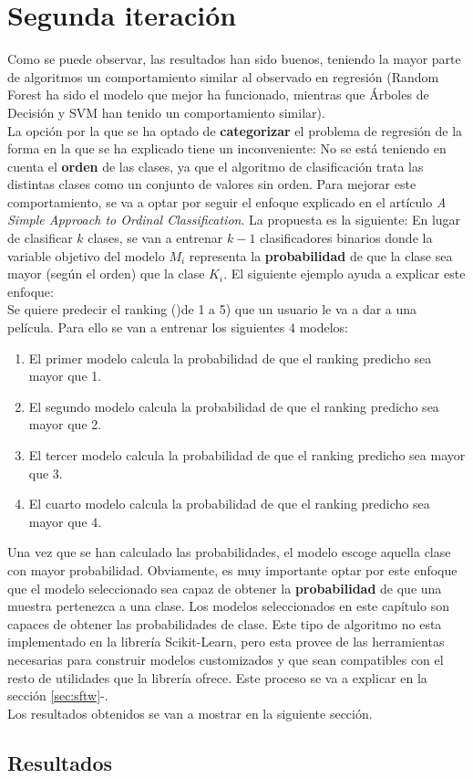 \section{Segunda iteración}
Como se puede observar, las resultados han sido buenos, teniendo la mayor parte de algoritmos un comportamiento similar al observado en regresión (Random Forest ha sido el modelo que mejor ha funcionado, mientras que Árboles de Decisión y SVM han tenido un comportamiento similar).\\
La opción por la que se ha optado de \textbf{categorizar} el problema de regresión de la forma en la que se ha explicado tiene un inconveniente: No se está teniendo en cuenta el \textbf{orden} de las clases, ya que el algoritmo de clasificación trata las distintas clases como un conjunto de valores sin orden.
Para mejorar este comportamiento, se va a optar por seguir el enfoque explicado en el artículo \textit{A Simple Approach to Ordinal Classification}. La propuesta es la siguiente:
En lugar de clasificar $k$ clases, se van a entrenar $k-1$ clasificadores binarios donde la variable objetivo del modelo $M_i$ representa la \textbf{probabilidad} de que la clase sea mayor (según el orden) que la clase $K_i$. El siguiente ejemplo ayuda a explicar este enfoque:\\
\linebreak
Se quiere predecir el ranking ()de 1 a 5) que un usuario le va a dar a una película. Para ello se van a entrenar los siguientes $4$ modelos:
\begin{enumerate}
    \item El primer modelo calcula la probabilidad de que el ranking predicho sea mayor que 1.
    \item El segundo modelo calcula la probabilidad de que el ranking predicho sea mayor que 2.
    \item El tercer modelo calcula la probabilidad de que el ranking predicho sea mayor que 3.
    \item El cuarto modelo calcula la probabilidad de que el ranking predicho sea mayor que 4.
\end{enumerate}
Una vez que se han calculado las probabilidades, el modelo escoge aquella clase con mayor probabilidad. Obviamente, es muy importante optar por este enfoque que el modelo seleccionado sea capaz de obtener la \textbf{probabilidad} de que una muestra pertenezca a una clase. Los modelos seleccionados en este capítulo son capaces de obtener las probabilidades de clase.
\linebreak
Este tipo de algoritmo no esta implementado en la librería Scikit-Learn, pero esta provee de las herramientas necesarias para construir modelos customizados y que sean compatibles con el resto de utilidades que la librería ofrece. Este proceso se va a explicar en la sección \ref{sec:sftw}-.\\
\linebreak
Los resultados obtenidos se van a mostrar en la siguiente sección.
\subsection{Resultados}

